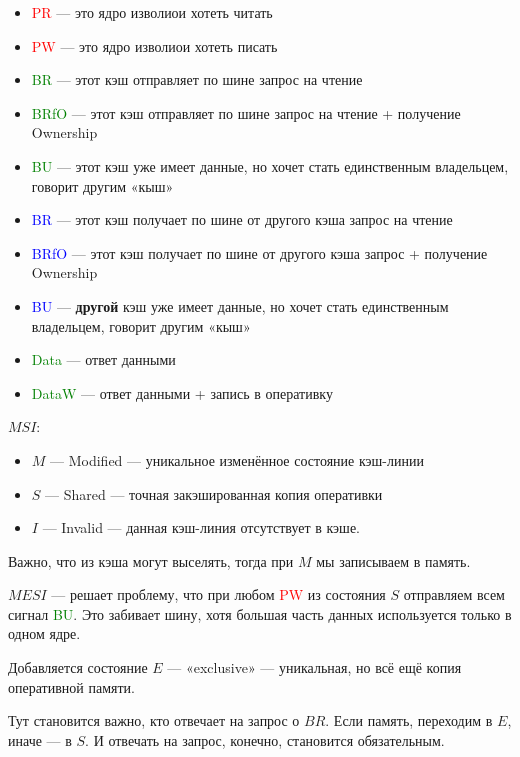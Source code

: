 \documentclass[12pt, a4paper]{article}
\begin{document}
\begin{itemize}
    \item \textcolor{red}{PR} — это ядро изволиои хотеть читать
    \item \textcolor{red}{PW} — это ядро изволиои хотеть писать
    \item \textcolor{green}{BR} — этот кэш отправляет по шине запрос на чтение
    \item \textcolor{green}{BRfO} — этот кэш отправляет по шине запрос на чтение + получение Ownership
    \item \textcolor{green}{BU} — этот кэш уже имеет данные, но хочет стать единственным владельцем, говорит другим «кыш»
    \item \textcolor{blue}{BR} — этот кэш получает по шине от другого кэша запрос на чтение
    \item \textcolor{blue}{BRfO} — этот кэш получает по шине от другого кэша запрос + получение Ownership
    \item \textcolor{blue}{BU} — \textbf{другой} кэш уже имеет данные, но хочет стать единственным владельцем, говорит другим «кыш»
    \item \textcolor{green}{Data} — ответ данными
    \item \textcolor{green}{DataW} — ответ данными + запись в оперативку
\end{itemize}

$MSI$:

\begin{itemize}
    \item $M$ — Modified — уникальное изменённое состояние кэш-линии
    \item $S$ — Shared — точная закэшированная копия оперативки
    \item $I$ — Invalid — данная кэш-линия отсутствует в кэше.
\end{itemize}

Важно, что из кэша могут выселять, тогда при $M$ мы записываем в память.

$MESI$ — решает проблему, что при любом \textcolor{red}{PW} из состояния $S$ отправляем всем сигнал \textcolor{green}{BU}.
Это забивает шину, хотя большая часть данных используется только в одном ядре.

Добавляется состояние $E$ — «exclusive» — уникальная, но всё ещё копия оперативной памяти.

Тут становится важно, кто отвечает на запрос о $BR$. Если память, переходим в $E$, иначе — в $S$.
И отвечать на запрос, конечно, становится обязательным.
\end{document}
